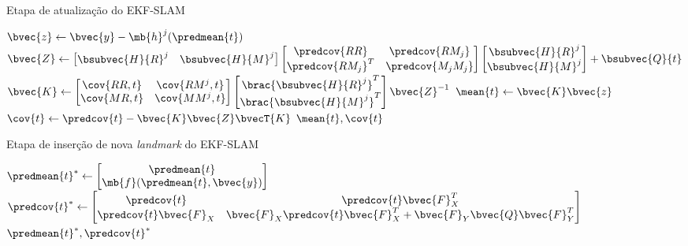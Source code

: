 \begin{algorithm}[h]
  \caption{Etapa de atualização do EKF-SLAM}
  \label{alg:ekf-slam-update}
\begin{algorithmic}[1]
  \State $\bvec{z} \gets \bvec{y} - \mb{h}^j(\predmean{t})$
  \State $\bvec{Z} \gets \begin{bmatrix}
    \bsubvec{H}{R}^j & \bsubvec{H}{M}^j
  \end{bmatrix}
  \begin{bmatrix}
    \predcov{RR} & \predcov{RM_j} \\
    \predcov{RM_j}^T & \predcov{M_j M_j}
  \end{bmatrix}
  \begin{bmatrix}
    \bsubvec{H}{R}^j \\ \bsubvec{H}{M}^j
  \end{bmatrix} + \bsubvec{Q}{t}$
  \State $\bvec{K} \gets \begin{bmatrix} \cov{RR, t} & \cov{RM^j, t} \\ 
    \cov{MR, t} & \cov{MM^j, t} 
  \end{bmatrix}
  \begin{bmatrix}
    \brac{\bsubvec{H}{R}^j}^T \\ \brac{\bsubvec{H}{M}^j}^T
  \end{bmatrix} \bvec{Z}^{-1}$
  \State $\mean{t} \gets \bvec{K} \bvec{z}$
  \State $\cov{t} \gets \predcov{t} - \bvec{K}\bvec{Z}\bvecT{K}$
  \State \Return $\mean{t}, \cov{t}$
  \EndProcedure
\end{algorithmic}
\end{algorithm}

\begin{algorithm}
  \caption{Etapa de inserção de nova \textit{landmark} do EKF-SLAM}
  \label{alg:ekf-slam-landmark-insertion}
\begin{algorithmic}[1]
    \State $\predmean{t}^* \gets \begin{bmatrix}
      \predmean{t} \\ \mb{f}(\predmean{t}, \bvec{y})
    \end{bmatrix}$
    \State $\predcov{t}^* \gets \begin{bmatrix}
      \predcov{t} & \predcov{t} \bvec{F}_X^T\\
       \predcov{t} \bvec{F}_X &  \bvec{F}_X \predcov{t} \bvec{F}_X^T 
       + \bvec{F}_Y \bvec{Q} \bvec{F}_Y^T
    \end{bmatrix}$
    \State \Return $\predmean{t}^*, \predcov{t}^*$
  \EndProcedure
\end{algorithmic}
\end{algorithm}

